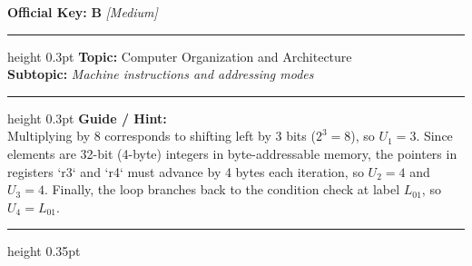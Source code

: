 \documentclass[a4paper,10pt]{article}
\begin{document}
\begin{tcolorbox}
\tcblower

\textbf{Official Key:} \textbf{\large B} \hfill \textit{\small [Medium]}
\vspace{2pt}\hrule height 0.3pt\vspace{3pt}
\textbf{Topic:} Computer Organization and Architecture \\
\textbf{Subtopic:} \textit{Machine instructions and addressing modes}
\vspace{2pt}\hrule height 0.3pt\vspace{3pt}
\textbf{Guide / Hint:} \\
{\small Multiplying by 8 corresponds to shifting left by 3 bits ($2^3 = 8$), so $U_1 = 3$. Since elements are 32-bit (4-byte) integers in byte-addressable memory, the pointers in registers `r3` and `r4` must advance by 4 bytes each iteration, so $U_2 = 4$ and $U_3 = 4$. Finally, the loop branches back to the condition check at label $L_{01}$, so $U_4 = L_{01}$.}

\end{tcolorbox}
\vspace{6pt}\hrule height 0.35pt\vspace{6pt}
\noindent
\end{document}
